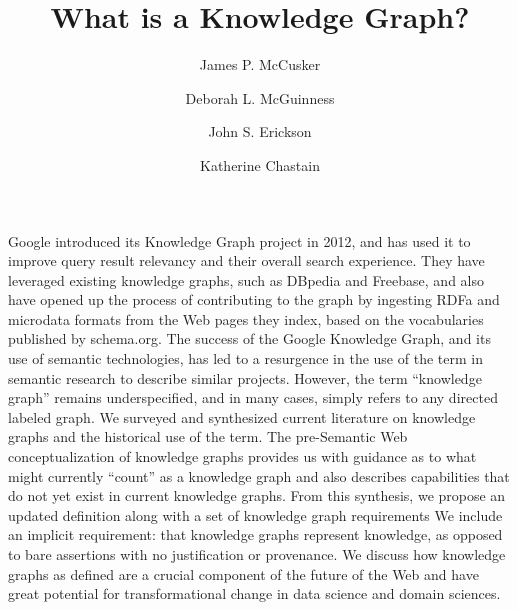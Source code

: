 \documentclass[runningheads,a4paper]{llncs}
\begin{document}
\mainmatter  %

\title{What is a Knowledge Graph?}


%
%

\author{James P. McCusker%
\and Deborah L. McGuinness\and John S. Erickson\and Katherine Chastain}


%
%

\maketitle


Google introduced its Knowledge Graph project in 2012, and has used it to improve query result relevancy and their overall search experience.
They have leveraged existing knowledge graphs, such as DBpedia and Freebase, and also have opened up the process of contributing to the graph by ingesting RDFa and microdata formats from the Web pages they index, based on the vocabularies published by schema.org.
The success of the Google Knowledge Graph, and its use of semantic technologies, has led to a resurgence in the use of the term in semantic research to describe similar projects.
However, the term ``knowledge graph'' remains underspecified, and in many cases, simply refers to any directed labeled graph.
We surveyed and synthesized current literature on knowledge graphs and the historical use of the term.  
The pre-Semantic Web conceptualization of knowledge graphs provides us with guidance as to what might currently ``count'' as a knowledge graph and also describes capabilities that do not yet exist in current knowledge graphs.
From this synthesis, we propose an updated definition along with a set of knowledge graph requirements  We include an implicit requirement: that knowledge graphs represent knowledge, as opposed to bare assertions with no justification or provenance.
We discuss how knowledge graphs as defined are a crucial component of the future of the Web and have great potential for transformational change in data science and domain sciences.
\end{document}
